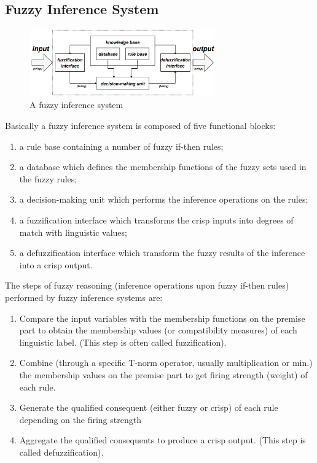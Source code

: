 \documentclass[10pt,twocolumn,letterpaper]{article}
\begin{document}
\subsection{Fuzzy Inference System}

\begin{figure}[h]
\includegraphics[width=8cm]{images/inferenceSys.PNG}
\caption{A fuzzy inference system}
\end{figure}
Basically a fuzzy  inference system  is composed  of five functional blocks:
\begin{enumerate}
    \item a rule base containing a number of fuzzy if-then rules;
    \item a database which defines the membership functions of the fuzzy sets used in the fuzzy rules;
    \item a decision-making unit which performs the inference operations on the rules;
    \item a fuzzification interface which transforms the crisp inputs into degrees of match with linguistic values;
    \item a defuzzification interface which transform the fuzzy results of the inference into a crisp output.~\cite{jang}
\end{enumerate}
The steps of fuzzy reasoning (inference operations upon fuzzy if-then rules) performed by fuzzy inference systems are:
\begin{enumerate}
    \item  Compare the input variables with the membership functions on the premise part to obtain the membership values (or compatibility measures) of each linguistic label. (This step is often called fuzzification).
    \item Combine (through a specific T-norm operator, usually multiplication or min.) the membership values on the
premise part to get firing strength (weight) of each rule.
    \item Generate the qualified consequent (either fuzzy or crisp) of each rule depending on the firing strength
    \item Aggregate the qualified consequents to produce a crisp output. (This step is called defuzzification).~\cite{jang}
\end{enumerate}
\end{document}
